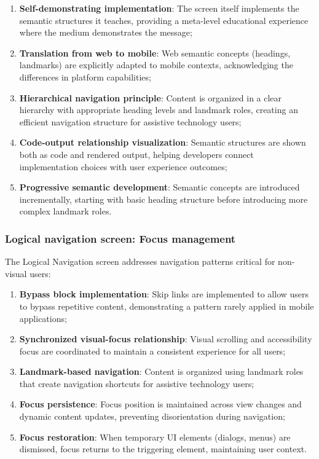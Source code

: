 \begin{enumerate}
    \item \textbf{Self-demonstrating implementation}: The screen itself implements the semantic structures it teaches, providing a meta-level educational experience where the medium demonstrates the message;
    
    \item \textbf{Translation from web to mobile}: Web semantic concepts (headings, landmarks) are explicitly adapted to mobile contexts, acknowledging the differences in platform capabilities;
    
    \item \textbf{Hierarchical navigation principle}: Content is organized in a clear hierarchy with appropriate heading levels and landmark roles, creating an efficient navigation structure for assistive technology users;
    
    \item \textbf{Code-output relationship visualization}: Semantic structures are shown both as code and rendered output, helping developers connect implementation choices with user experience outcomes;
    
    \item \textbf{Progressive semantic development}: Semantic concepts are introduced incrementally, starting with basic heading structure before introducing more complex landmark roles.
\end{enumerate}

\subsubsection{Logical navigation screen: Focus management}

The Logical Navigation screen addresses navigation patterns critical for non-visual users:

\begin{enumerate}
    \item \textbf{Bypass block implementation}: Skip links are implemented to allow users to bypass repetitive content, demonstrating a pattern rarely applied in mobile applications;
    
    \item \textbf{Synchronized visual-focus relationship}: Visual scrolling and accessibility focus are coordinated to maintain a consistent experience for all users;
    
    \item \textbf{Landmark-based navigation}: Content is organized using landmark roles that create navigation shortcuts for assistive technology users;
    
    \item \textbf{Focus persistence}: Focus position is maintained across view changes and dynamic content updates, preventing disorientation during navigation;
    
    \item \textbf{Focus restoration}: When temporary UI elements (dialogs, menus) are dismissed, focus returns to the triggering element, maintaining user context.
\end{enumerate}

